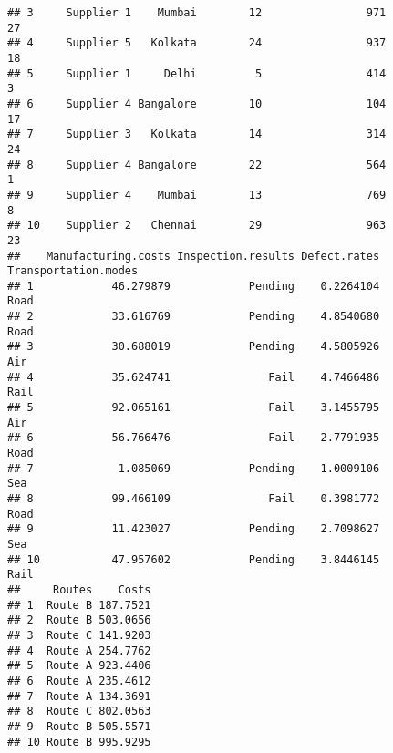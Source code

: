 \documentclass[
]{article}
\newenvironment{Shaded}{\begin{snugshade}}{\end{snugshade}}
\newcommand{\FunctionTok}[1]{\textcolor[rgb]{0.13,0.29,0.53}{\textbf{#1}}}
\newcommand{\NormalTok}[1]{#1}
\newcommand{\OtherTok}[1]{\textcolor[rgb]{0.56,0.35,0.01}{#1}}
\newcommand{\SpecialCharTok}[1]{\textcolor[rgb]{0.81,0.36,0.00}{\textbf{#1}}}
\begin{document}
\begin{verbatim}
## 3     Supplier 1    Mumbai        12                971                      27
## 4     Supplier 5   Kolkata        24                937                      18
## 5     Supplier 1     Delhi         5                414                       3
## 6     Supplier 4 Bangalore        10                104                      17
## 7     Supplier 3   Kolkata        14                314                      24
## 8     Supplier 4 Bangalore        22                564                       1
## 9     Supplier 4    Mumbai        13                769                       8
## 10    Supplier 2   Chennai        29                963                      23
##    Manufacturing.costs Inspection.results Defect.rates Transportation.modes
## 1            46.279879            Pending    0.2264104                 Road
## 2            33.616769            Pending    4.8540680                 Road
## 3            30.688019            Pending    4.5805926                  Air
## 4            35.624741               Fail    4.7466486                 Rail
## 5            92.065161               Fail    3.1455795                  Air
## 6            56.766476               Fail    2.7791935                 Road
## 7             1.085069            Pending    1.0009106                  Sea
## 8            99.466109               Fail    0.3981772                 Road
## 9            11.423027            Pending    2.7098627                  Sea
## 10           47.957602            Pending    3.8446145                 Rail
##     Routes    Costs
## 1  Route B 187.7521
## 2  Route B 503.0656
## 3  Route C 141.9203
## 4  Route A 254.7762
## 5  Route A 923.4406
## 6  Route A 235.4612
## 7  Route A 134.3691
## 8  Route C 802.0563
## 9  Route B 505.5571
## 10 Route B 995.9295
\end{verbatim}

\begin{Shaded}
\end{Shaded}
\end{document}
